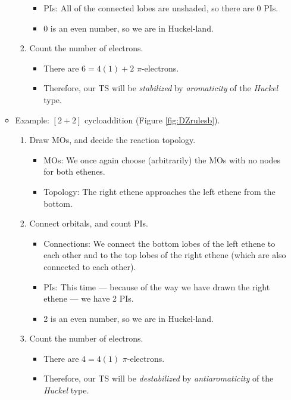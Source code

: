 \documentclass[../notes.tex]{subfiles}
\begin{document}
\begin{itemize}
\begin{itemize}
\begin{enumerate}
\begin{itemize}
                \item PIs: All of the connected lobes are unshaded, so there are 0 PIs.
                \item 0 is an even number, so we are in Huckel-land.
            \end{itemize}
            \item Count the number of electrons.
            \begin{itemize}
                \item There are $6=4(1)+2$ $\pi$-electrons.
                \item Therefore, our TS will be \emph{stabilized} by \emph{aromaticity} of the \emph{Huckel} type.
            \end{itemize}
        \end{enumerate}
        \item Example: $[2+2]$ cycloaddition (Figure \ref{fig:DZrulesb}).
        \begin{enumerate}
            \item Draw MOs, and decide the reaction topology.
            \begin{itemize}
                \item MOs: We once again choose (arbitrarily) the MOs with no nodes for both ethenes.
                \item Topology: The right ethene approaches the left ethene from the bottom.
            \end{itemize}
            \item Connect orbitals, and count PIs.
            \begin{itemize}
                \item Connections: We connect the bottom lobes of the left ethene to each other and to the top lobes of the right ethene (which are also connected to each other).
                \item PIs: This time --- because of the way we have drawn the right ethene --- we have 2 PIs.
                \item 2 is an even number, so we are in Huckel-land.
            \end{itemize}
            \item Count the number of electrons.
            \begin{itemize}
                \item There are $4=4(1)$ $\pi$-electrons.
                \item Therefore, our TS will be \emph{destabilized} by \emph{antiaromaticity} of the \emph{Huckel} type.

\end{itemize}
\end{enumerate}
\end{itemize}
\end{itemize}
\end{document}
